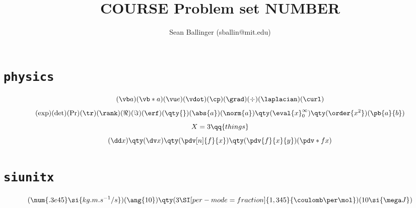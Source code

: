 \documentclass{homework}
\author{Sean Ballinger (sballin@mit.edu)}
\title{COURSE Problem set NUMBER}
\begin{document}
\maketitle

\section*{\verb|physics|}
    \[(\vb a)(\vb* a)(\vu e)(\vdot)(\cp)(\grad)(\div)(\laplacian)(\curl)\]
    \[(\exp)(\det)(\Pr)(\tr)(\rank)(\Re)(\Im)(\erf)(\qty{})(\abs{a})(\norm {a})\qty(\eval{x}_0^\infty)\qty(\order{x^2})(\pb{a}{b})\]
    \[X=3\qq{things}\]
    \[(\dd x)\qty(\dv x)\qty(\pdv[n]{f}{x})\qty(\pdv{f}{x}{y})(\pdv*{f}{x})\]

    
\section*{\verb|siunitx|}
    \[(\num{.3e45}\si{kg.m.s^{-1}/s})(\ang{10})\qty(3\SI[per-mode=fraction]{1,345}{\coulomb\per\mol})(10\si{\mega J})\]
\end{document}
